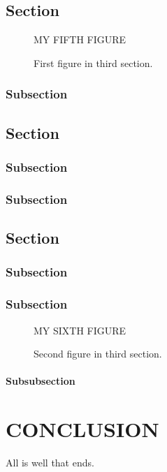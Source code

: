 \documentclass[12pt,econ]{authesis}
\begin{document}
\section{Section}

\begin{figure}
\centering MY FIFTH FIGURE
\caption{First figure in third section.}
\end{figure}


\subsection{Subsection}

\section{Section}
\subsection{Subsection}
\subsection{Subsection}
\section{Section}
\subsection{Subsection}
\subsection{Subsection}

\begin{figure}
\centering MY SIXTH FIGURE
\caption{Second figure in third section.}
\end{figure}


\subsubsection{Subsubsection}


\chapter{CONCLUSION}

All is well that ends.
\end{document}
